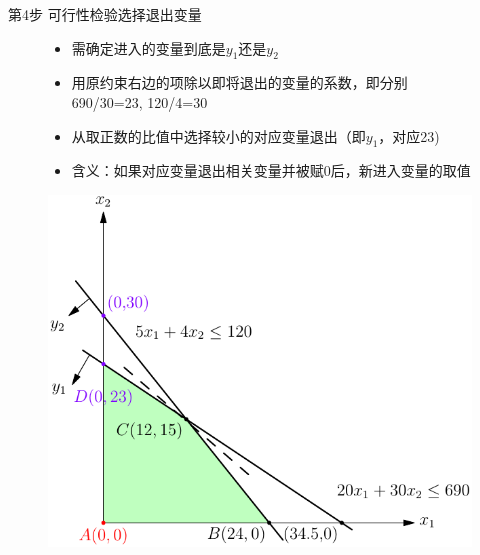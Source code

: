 \documentclass[UTF8]{ctexbeamer}
\begin{document}
\begin{frame}{第4步 可行性检验选择退出变量}
  \begin{figure}
    \begin{minipage}{.5\linewidth}
      \begin{itemize}
      \item 需确定进入的变量到底是$y_1$还是$y_2$
      \item 用原约束右边的项除以即将退出的变量的系数，即分别690/30=23, 120/4=30
      \item 从取正数的比值中选择较小的对应变量退出（即$y_1$，对应23)
      \item 含义：如果对应变量退出相关变量并被赋0后，新进入变量的取值
      \end{itemize}
    \end{minipage}%
    \begin{minipage}{.5\linewidth}
      \includegraphics[width=\textwidth{}]{simplex-feasible.pdf}
    \end{minipage}
  \end{figure}  
\end{frame}
\end{document}
